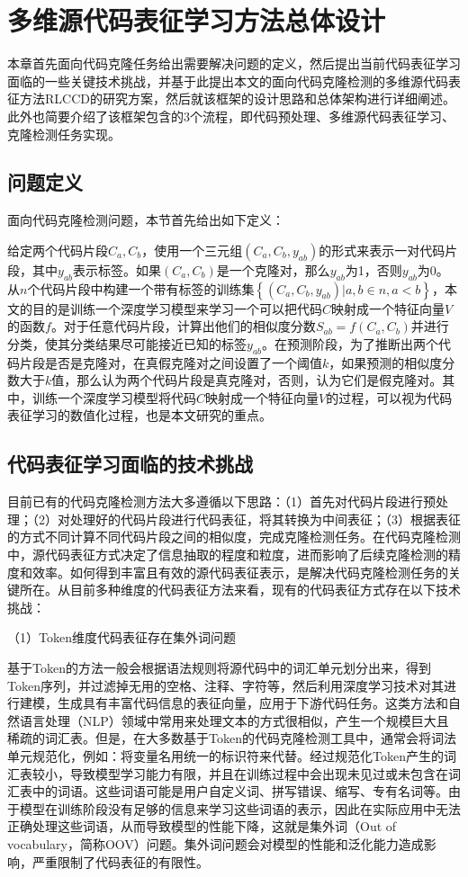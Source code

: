 \chapter{多维源代码表征学习方法总体设计}
\label{chap:design}

本章首先面向代码克隆任务给出需要解决问题的定义，然后提出当前代码表征学习面临的一些关键技术挑战，并基于此提出本文的面向代码克隆检测的多维源代码表征方法RLCCD的研究方案，然后就该框架的设计思路和总体架构进行详细阐述。此外也简要介绍了该框架包含的3个流程，即代码预处理、多维源代码表征学习、克隆检测任务实现。

\section{问题定义}
\label{sec:Definition}

面向代码克隆检测问题，本节首先给出如下定义：

给定两个代码片段$C_{a},C_{b}$，使用一个三元组$(C_{a},C_{b},y_{ab})$的形式来表示一对代码片段，其中$y_{ab}$表示标签。如果$(C_{a},C_{b})$是一个克隆对，那么$y_{ab}$为1，否则$y_{ab}$为0。从$n$个代码片段中构建一个带有标签的训练集$\left\{(C_{a},C_{b},y_{ab})|a,b \in n,a<b\right\}$，本文的目的是训练一个深度学习模型来学习一个可以把代码$C$映射成一个特征向量$V$的函数$f$。对于任意代码片段，计算出他们的相似度分数$S_{ab} = f(C_{a},C_{b})$并进行分类，使其分类结果尽可能接近已知的标签$y_{ab}$。在预测阶段，为了推断出两个代码片段是否是克隆对，在真假克隆对之间设置了一个阈值$k$，如果预测的相似度分数大于$k$值，那么认为两个代码片段是真克隆对，否则，认为它们是假克隆对。其中，训练一个深度学习模型将代码$C$映射成一个特征向量$V$的过程，可以视为代码表征学习的数值化过程，也是本文研究的重点。

\section{代码表征学习面临的技术挑战}
\label{sec:challenges}
目前已有的代码克隆检测方法大多遵循以下思路：（1）首先对代码片段进行预处理；（2）对处理好的代码片段进行代码表征，将其转换为中间表征；（3）根据表征的方式不同计算不同代码片段之间的相似度，完成克隆检测任务。在代码克隆检测中，源代码表征方式决定了信息抽取的程度和粒度，进而影响了后续克隆检测的精度和效率。如何得到丰富且有效的源代码表征表示，是解决代码克隆检测任务的关键所在。从目前多种维度的代码表征方法来看，现有的代码表征方式存在以下技术挑战：

（1）Token维度代码表征存在集外词问题

基于Token的方法一般会根据语法规则将源代码中的词汇单元划分出来，得到Token序列，并过滤掉无用的空格、注释、字符等，然后利用深度学习技术对其进行建模，生成具有丰富代码信息的表征向量，应用于下游代码任务。这类方法和自然语言处理（NLP）领域中常用来处理文本的方式很相似，产生一个规模巨大且稀疏的词汇表。但是，在大多数基于Token的代码克隆检测工具中，通常会将词法单元规范化，例如：将变量名用统一的标识符来代替。经过规范化Token产生的词汇表较小，导致模型学习能力有限，并且在训练过程中会出现未见过或未包含在词汇表中的词语。这些词语可能是用户自定义词、拼写错误、缩写、专有名词等。由于模型在训练阶段没有足够的信息来学习这些词语的表示，因此在实际应用中无法正确处理这些词语，从而导致模型的性能下降，这就是集外词（Out of vocabulary，简称OOV）问题。集外词问题会对模型的性能和泛化能力造成影响，严重限制了代码表征的有限性。

